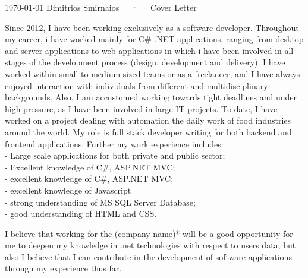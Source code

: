 \documentclass[11pt, a4paper]{awesome-cv}
\begin{document}
\makecvheader[R]

\makecvfooter
  {\today}
  {Dimitrios Smirnaios~~~·~~~Cover Letter}
  {}

\makelettertitle

\begin{cvletter}

Since 2012, I have been working exclusively as a software developer. Throughout my career, i have worked mainly for C# .NET applications, ranging from desktop and server applications to web applications in which i have been involved in all stages of the development process (design, development and delivery). I have worked within small to medium sized teams or as a freelancer, and I have always enjoyed interaction with individuals from different and multidisciplinary backgrounds. Also, I am accustomed working towards tight deadlines and under high pressure, as I have been involved in large IT projects. Τo date, I have worked on a project dealing with automation the daily work of food industries around the world. My role is full stack developer writing for both backend and frontend applications.
Further my work experience includes:\\
- Large scale applications for both private and public sector;\\
- Excellent knowledge of C\#, ASP.NET MVC;\\
- excellent knowledge of C\#, ASP.NET MVC;\\
- excellent knowledge of Javascript\\
- strong understanding of MS SQL Server Database;\\
- good understanding of HTML and CSS.

I believe that working for the (company name)* will be a good opportunity for me to deepen my knowledge in .net technologies with respect to users data, but also I believe that I can contribute in the development of software applications through my experience thus far.


\end{cvletter}
\end{document}
